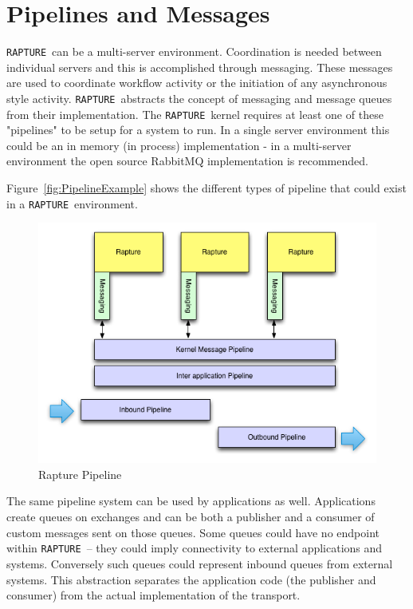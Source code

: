 \documentclass[12pt,twoside,a4paper]{book}
\newcommand{\Rapture}{\Verb+RAPTURE+~}
\begin{document}
\section{Pipelines and Messages}
\Rapture can be a multi-server environment. Coordination is needed between individual servers and this is accomplished through messaging. These messages are
used to coordinate workflow activity or the initiation of any asynchronous style activity. \Rapture abstracts the concept of messaging and message queues from their
implementation. The \Rapture kernel requires at least one of these "pipelines" to be setup for a system to run. In a single server environment
this could be an in memory (in process) implementation - in a multi-server environment the open source RabbitMQ implementation is recommended.

Figure~\vref{fig:PipelineExample} shows the different types of pipeline that could exist in a \Rapture environment.

\begin{figure}[H]
\centering
\includegraphics[scale=0.75]{Graphics/PipelineExplain}
\caption{Rapture Pipeline}
\label{fig:PipelineExample}
\end{figure}

The same pipeline system can be used by applications as well. Applications create queues on exchanges and can be both a publisher and a consumer of custom messages
sent on those queues. Some queues could have no endpoint within \Rapture -- they could imply connectivity to external applications and systems. Conversely such queues could
represent inbound queues from external systems. This abstraction separates the application code (the publisher and consumer) from the actual implementation of the transport.
\end{document}
